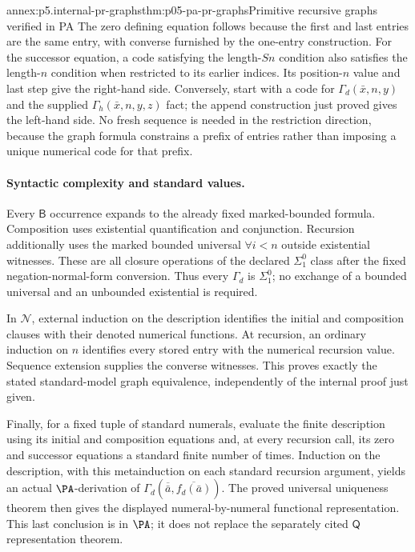 \begin{annexitem}{annex:p5.internal-pr-graphs}{thm:p05-pa-pr-graphs}{Primitive recursive graphs verified in PA}
The zero defining equation follows because the first and last entries are
the same entry, with converse furnished by the one-entry construction.
For the successor equation, a code satisfying the length-\(Sn\) condition
also satisfies the length-\(n\) condition when restricted to its earlier
indices.  Its position-\(n\) value and last step give the right-hand side.
Conversely, start with a code for \(\Gamma_d(\bar x,n,y)\) and the
supplied \(\Gamma_h(\bar x,n,y,z)\) fact; the append construction just
proved gives the left-hand side.  No fresh sequence is needed in the
restriction direction, because the graph formula constrains a prefix of
entries rather than imposing a unique numerical code for that prefix.

\paragraph{Syntactic complexity and standard values.}
Every \(\mathsf B\) occurrence expands to the already fixed marked-bounded
formula.  Composition uses existential quantification and conjunction.
Recursion additionally uses the marked bounded universal \(\forall i<n\)
outside existential witnesses.  These are all closure operations of the
declared \(\Sigma^0_1\) class after the fixed negation-normal-form conversion.
Thus every \(\Gamma_d\) is \(\Sigma^0_1\); no exchange of a bounded
universal and an unbounded existential is required.

In \(\mathcal N\), external induction on the description identifies the
initial and composition clauses with their denoted numerical functions.
At recursion, an ordinary induction on \(n\) identifies every stored
entry with the numerical recursion value.  Sequence extension supplies the
converse witnesses.  This proves exactly the stated standard-model graph
equivalence, independently of the internal proof just given.

Finally, for a fixed tuple of standard numerals, evaluate the finite
description using its initial and composition equations and, at every
recursion call, its zero and successor equations a standard finite number
of times.  Induction on the description, with this metainduction on each
standard recursion argument, yields an actual \(\PA\)-derivation of
\(\Gamma_d(\overline{\bar a},\overline{f_d(\bar a)})\).
The proved universal uniqueness theorem then gives the displayed
numeral-by-numeral functional representation.  This last conclusion is in
\(\PA\); it does not replace the separately cited \(\mathsf Q\)
representation theorem.


\end{annexitem}
